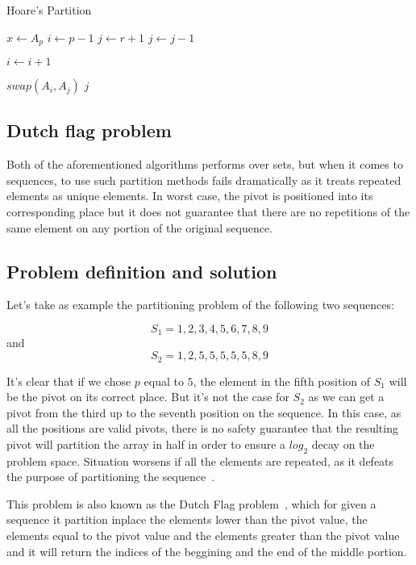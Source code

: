 \begin{algorithm}
\caption{Hoare's Partition}\label{ALG:HOARE_PARTITION}
\begin{algorithmic}[1]
    \State $x \gets A_p$
    \State $i \gets p-1$
    \State $j \gets r+1$
        \Do 
            \State $j \gets j - 1$

        \Do 
            \State $i \gets i + 1$

            \State $swap(A_i, A_j)$
        \Else
            \State \Return $j$
        \EndIf
    \EndWhile
    \EndProcedure
\end{algorithmic}
\end{algorithm}

\subsection{Dutch flag problem}
Both of the aforementioned algorithms performs over sets, but when it comes to sequences, to use such partition methods fails dramatically as it treats repeated elements as unique elements. In worst case, the pivot is positioned into its corresponding place but it does not guarantee that there are no repetitions of the same element on any portion of the original sequence.

\subsection{Problem definition and solution}
Let's take as example the partitioning problem of the following two sequences:

$$ S_1={1,2,3,4,5,6,7,8,9} $$
and
$$S_2={1,2,5,5,5,5,5,8,9}$$

It's clear that if we chose $p$ equal to $5$, the element in the fifth position of $S_1$ will be the pivot on its correct place. But it's not the case for $S_2$ as we can get a pivot from the third up to the seventh position on the sequence. In this case, as all the positions are valid pivots, there is no safety guarantee that the resulting pivot will partition the array in half in order to ensure a $log_2$ decay on the problem space. Situation worsens if all the elements are repeated, as it defeats the purpose of partitioning the sequence~\cite{7416566}.

This problem is also known as the Dutch Flag problem~\cite{10.5555/550359}, which for given a sequence it partition inplace the elements lower than the pivot value, the elements equal to the pivot value and the elements greater than the pivot value and it will return the indices of the beggining and the end of the middle portion.

